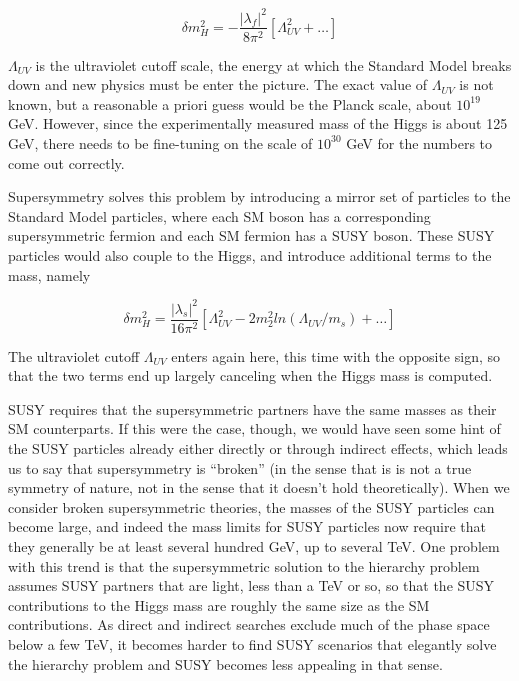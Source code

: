 \begin{equation}
	\delta m_H^2 = -\frac{|\lambda_f |^2}{8\pi^2}[\Lambda_{UV}^2+\ldots]
\end{equation}

$\Lambda_{UV}$ is the ultraviolet cutoff scale, the energy at which the Standard Model breaks down and new physics must be enter the picture.  The exact value of $\Lambda_{UV}$ is not known, but a reasonable a priori guess would be the Planck scale, about $10^{19}$ GeV.  However, since the experimentally measured mass of the Higgs is about 125 GeV, there needs to be fine-tuning on the scale of $10^{30}$ GeV for the numbers to come out correctly.

Supersymmetry solves this problem by introducing a mirror set of particles to the Standard Model particles, where each SM boson has a corresponding supersymmetric fermion and each SM fermion has a SUSY boson.  These SUSY particles would also couple to the Higgs, and introduce additional terms to the mass, namely

\begin{equation}
	\delta m_H^2 = \frac{|\lambda_s |^2}{16\pi^2}[\Lambda_{UV}^2-2m_2^2ln(\Lambda_{UV}/m_s)+\ldots]
\end{equation}

The ultraviolet cutoff $\Lambda_{UV}$ enters again here, this time with the opposite sign, so that the two terms end up largely canceling when the Higgs mass is computed.  

SUSY requires that the supersymmetric partners have the same masses as their SM counterparts.  If this were the case, though, we would have seen some hint of the SUSY particles already either directly or through indirect effects, which leads us to say that supersymmetry is ``broken'' (in the sense that is is not a true symmetry of nature, not in the sense that it doesn't hold theoretically).  When we consider broken supersymmetric theories, the masses of the SUSY particles can become large, and indeed the mass limits for SUSY particles now require that they generally be at least several hundred GeV, up to several TeV.  One problem with this trend is that the supersymmetric solution to the hierarchy problem assumes SUSY partners that are light, less than a TeV or so, so that the SUSY contributions to the Higgs mass are roughly the same size as the SM contributions.  As direct and indirect searches exclude much of the phase space below a few TeV, it becomes harder to find SUSY scenarios that elegantly solve the hierarchy problem and SUSY becomes less appealing in that sense. 

